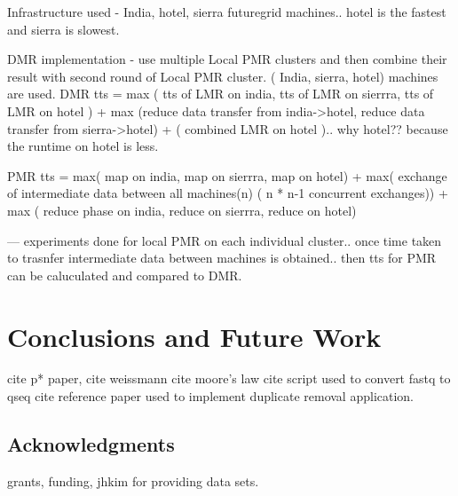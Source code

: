 \documentclass{acm_proc_article-sp}
\begin{document}
Infrastructure used - India, hotel, sierra futuregrid machines.. hotel is the fastest and sierra is slowest.

DMR implementation - use multiple Local PMR clusters and then combine their result with second round of Local PMR cluster. ( India, sierra, hotel) machines are used.
DMR tts = max ( tts of LMR on india, tts of LMR  on sierrra, tts of LMR  on hotel ) + max (reduce data transfer from india->hotel, reduce data transfer from sierra->hotel) + ( combined LMR on hotel ).. why hotel?? because the runtime on hotel is less.  

PMR tts = max( map  on india, map on  sierrra, map on hotel) + max( exchange of intermediate data between all machines(n) ( n * n-1 concurrent exchanges)) + max ( reduce phase on  india, reduce on  sierrra, reduce on hotel)

--- experiments done for local PMR on each individual cluster.. once time taken to trasnfer intermediate data between machines is obtained.. then tts for PMR can be caluculated and compared to DMR.



\section{Conclusions and Future Work}




%

%
%

cite p* paper,
cite weissmann
cite moore's law
cite script used to convert fastq to qseq
cite reference paper used to implement duplicate removal application.


\subsection*{Acknowledgments}
grants, funding, jhkim for providing data sets.
\end{document}
